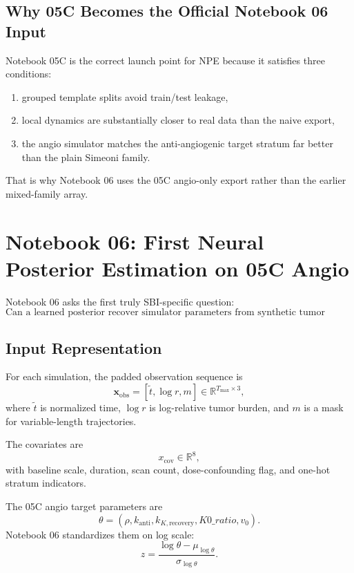 \documentclass[11pt,a4paper]{article}
\newcommand{\R}{\mathbb{R}}
\newcommand{\xobs}{\mathbf{x}_{\mathrm{obs}}}
\begin{document}
\subsection{Why 05C Becomes the Official Notebook 06 Input}

Notebook 05C is the correct launch point for NPE because it satisfies three conditions:
\begin{enumerate}[leftmargin=2em]
    \item grouped template splits avoid train/test leakage,
    \item local dynamics are substantially closer to real data than the naive export,
    \item the angio simulator matches the anti-angiogenic target stratum far better than the plain Simeoni family.
\end{enumerate}

That is why Notebook 06 uses the 05C angio-only export rather than the earlier mixed-family array.

\section{Notebook 06: First Neural Posterior Estimation on 05C Angio}

Notebook 06 asks the first truly SBI-specific question:
\[
    \text{Can a learned posterior recover simulator parameters from synthetic tumor trajectories?}
\]

\subsection{Input Representation}

For each simulation, the padded observation sequence is
\[
    \xobs
    =
    [\tilde t,\log r,m]
    \in\R^{T_{\max}\times 3},
\]
where $\tilde t$ is normalized time, $\log r$ is log-relative tumor burden, and $m$ is a mask for variable-length trajectories.

The covariates are
\[
    x_{\mathrm{cov}}\in\R^8,
\]
with baseline scale, duration, scan count, dose-confounding flag, and one-hot stratum indicators.

The 05C angio target parameters are
\[
    \theta=(\rho,k_{\mathrm{anti}},k_{K,\mathrm{recovery}},K0\_ratio,v_0).
\]
Notebook 06 standardizes them on log scale:
\[
    z=\frac{\log\theta-\mu_{\log\theta}}{\sigma_{\log\theta}}.
\]
\end{document}

